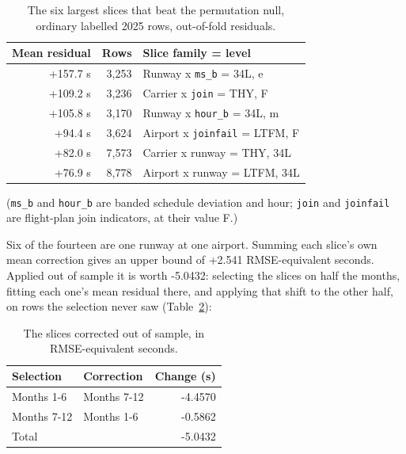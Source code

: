 \documentclass[
  manuscript=article,
  layout=preprint,
  year=2026,
  volume=x,
]{extra/joas}
\begin{document}
\begin{table}[htbp!]
  \centering
  \small
  \setlength{\tabcolsep}{5pt}\renewcommand{\arraystretch}{1.15}
  \caption{The six largest slices that beat the permutation null, ordinary labelled 2025 rows, out-of-fold residuals.}
  \label{tab:25}
  \begin{tabular*}{\linewidth}{@{\extracolsep{\fill}}rrl}
  \toprule
  \textbf{Mean residual} & \textbf{Rows} & \textbf{Slice family = level} \\
  \midrule
  +157.7 s & 3,253 & Runway x \texttt{ms\_b} = 34L, e \\
  +109.2 s & 3,236 & Carrier x \texttt{join} = THY, F \\
  +105.8 s & 3,170 & Runway x \texttt{hour\_b} = 34L, m \\
  +94.4 s & 3,624 & Airport x \texttt{joinfail} = LTFM, F \\
  +82.0 s & 7,573 & Carrier x runway = THY, 34L \\
  +76.9 s & 8,778 & Airport x runway = LTFM, 34L \\
  \bottomrule
  \end{tabular*}
\end{table}

(\texttt{ms\_b} and \texttt{hour\_b} are banded schedule deviation and hour; \texttt{join} and \texttt{joinfail} are flight-plan join indicators, at their value F.)

Six of the fourteen are one runway at one airport. Summing each slice's own mean correction gives an upper bound of +2.541 RMSE-equivalent seconds. Applied out of sample it is worth -5.0432: selecting the slices on half the months, fitting each one's mean residual there, and applying that shift to the other half, on rows the selection never saw (Table~\ref{tab:26}):

\begin{table}[htbp!]
  \centering
  \small
  \setlength{\tabcolsep}{5pt}\renewcommand{\arraystretch}{1.15}
  \caption{The slices corrected out of sample, in RMSE-equivalent seconds.}
  \label{tab:26}
  \begin{tabular*}{\linewidth}{@{\extracolsep{\fill}}llr}
  \toprule
  \textbf{Selection} & \textbf{Correction} & \textbf{Change (s)} \\
  \midrule
  Months 1-6 & Months 7-12 & -4.4570 \\
  Months 7-12 & Months 1-6 & -0.5862 \\
  \midrule
  Total &  & -5.0432 \\
  \bottomrule
  \end{tabular*}
\end{table}
\end{document}

